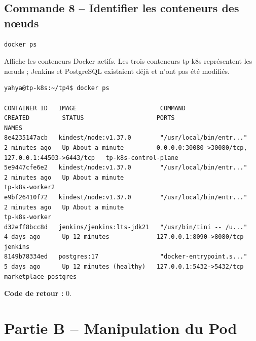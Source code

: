 \documentclass[11pt,a4paper]{article}
\begin{document}
\subsection{Commande 8 -- Identifier les conteneurs des nœuds}
\begin{lstlisting}
docker ps
\end{lstlisting}
Affiche les conteneurs Docker actifs. Les trois conteneurs tp-k8s représentent les nœuds ; Jenkins et PostgreSQL existaient déjà et n’ont pas été modifiés.
\begin{tcolorbox}[terminal,title={Ubuntu / WSL2 -- Commande 8 -- rendu reconstitué}]
\begin{Verbatim}[fontsize=\scriptsize,breaklines=true,breakanywhere=true,breaksymbolleft={},breaksymbolright={}]
yahya@tp-k8s:~/tp4$ docker ps

CONTAINER ID   IMAGE                       COMMAND                  CREATED         STATUS                    PORTS                                                 NAMES
8e4235147acb   kindest/node:v1.37.0        "/usr/local/bin/entr..."   2 minutes ago   Up About a minute         0.0.0.0:30080->30080/tcp, 127.0.0.1:44503->6443/tcp   tp-k8s-control-plane
5e9447cfe6e2   kindest/node:v1.37.0        "/usr/local/bin/entr..."   2 minutes ago   Up About a minute                                                               tp-k8s-worker2
e9bf26410f72   kindest/node:v1.37.0        "/usr/local/bin/entr..."   2 minutes ago   Up About a minute                                                               tp-k8s-worker
d32eff8bcc8d   jenkins/jenkins:lts-jdk21   "/usr/bin/tini -- /u..."   4 days ago      Up 12 minutes             127.0.0.1:8090->8080/tcp                              jenkins
8149b78334ed   postgres:17                 "docker-entrypoint.s..."   5 days ago      Up 12 minutes (healthy)   127.0.0.1:5432->5432/tcp                              marketplace-postgres
\end{Verbatim}
\end{tcolorbox}
\textbf{Code de retour :} 0.

\clearpage
\section{Partie B -- Manipulation du Pod}
\end{document}
